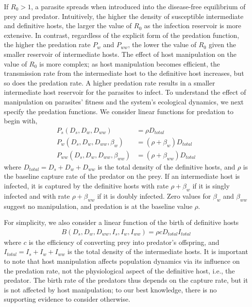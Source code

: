 \documentclass[a4paper]{scrartcl}
\begin{document}
If $R_0 > 1$, a parasite spreads when introduced into the disease-free equilibrium of prey and predator.
Intuitively, the higher the density of susceptible intermediate and definitive hosts, the larger the value of $R_0$ as the infection reservoir is more extensive. 
In contrast, regardless of the explicit form of the predation function, the higher the predation rate $P_w$ and $P_{ww}$, the lower the value of $R_0$ given the smaller reservoir of intermediate hosts. 
The effect of host manipulation on the value of $R_0$ is more complex; as host manipulation becomes efficient, the transmission rate from the intermediate host to the definitive host increases, but so does the predation rate. 
A higher predation rate results in a smaller intermediate host reservoir for the parasites to infect. 
To understand the effect of manipulation on parasites' fitness and the system's ecological dynamics, we next specify the predation functions. 
We consider linear functions for predation to begin with,
%
\begin{align*}
 P_s(D_s, D_w, D_{ww}) &= \rho D_{total}  \\
 P_w(D_s, D_w, D_{ww}, \beta_w) &= (\rho + \beta_w) D_{total} \\
 P_{ww}(D_s, D_w, D_{ww}, \beta_{ww}) &=  (\rho + \beta_{ww})D_{total}
\end{align*}
%
where $D_{total} = D_s + D_w + D_{ww}$ is the total density of the definitive hosts, and $\rho$ is the baseline capture rate of the predator on the prey. 
If an intermediate host is infected, it is captured by the definitive hosts with rate $\rho + \beta_w$ if it is singly infected and with rate $\rho + \beta_{ww}$ if it is doubly infected. 
Zero values for $\beta_w$ and $\beta_{ww}$ suggest no manipulation, and predation is at the baseline value $\rho$.

For simplicity, we also consider a linear function of the birth of definitive hosts
%
\begin{align*}
B(D_s, D_w, D_{ww}, I_s, I_w, I_{ww}) = \rho c D_{total} I_{total}
\end{align*}
%
where $c$ is the efficiency of converting prey into predator's offspring, and $I_{total} = I_s + I_w + I_{ww}$ is the total density of the intermediate hosts.
It is important to note that host manipulation affects population dynamics via its influence on the predation rate, not the physiological aspect of the definitive host, i.e., the predator.
The birth rate of the predators thus depends on the capture rate, but it is not affected by host manipulation; to our best knowledge, there is no supporting evidence to consider otherwise.
\end{document}
